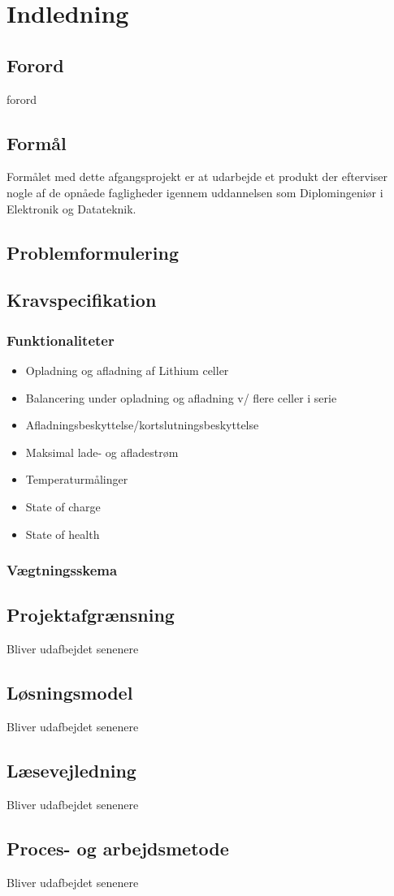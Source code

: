\chapter{Indledning}

\section{Forord}\label{sec:forord}
forord

\section{Formål}
Formålet med dette afgangsprojekt er at udarbejde et produkt der efterviser nogle af de opnåede fagligheder igennem uddannelsen som Diplomingeniør i Elektronik og Datateknik.

\section{Problemformulering}


\section{Kravspecifikation} \label{afs:kravspecifikation}

\subsection{Funktionaliteter}

\begin{itemize}
	\item Opladning og aﬂadning af Lithium celler
	\item Balancering under opladning og aﬂadning v/ ﬂere celler i serie
	\item Aﬂadningsbeskyttelse/kortslutningsbeskyttelse
	\item Maksimal lade- og aﬂadestrøm
	\item Temperaturmålinger
	\item State of charge
	\item State of health
\end{itemize} 
\subsection{Vægtningsskema}

\section{Projektafgrænsning}
Bliver udafbejdet senenere

\section{Løsningsmodel}
Bliver udafbejdet senenere

\section{Læsevejledning}
Bliver udafbejdet senenere

\section{Proces- og arbejdsmetode}
Bliver udafbejdet senenere
